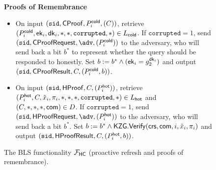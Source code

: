 \begin{figure*}
{{    \textbf{Proofs of Remembrance}
    \begin{itemize}
        \item On input $(\texttt{sid},\mathsf{CProof}, P_i^{\mathsf{cold}}, (C))$, retrieve $(P_i^{\mathsf{cold}}, \mathsf{ek}_i, \mathsf{dk}_i, *, *,\allowbreak \texttt{corrupted}, *) \in L_{\mathsf{cold}}$.
        If $\texttt{corrupted} = 1$, send $(\sid, \mathsf{CProofRequest},\allowbreak \adv, (P_i^\cold))$ to the adversary, who will send back a bit $b^*$ to represent whether the query should be responded to honestly. Set $b := b^* \land (\mathsf{ek}_i = g_2^{\mathsf{dk}_i})$ and
        output $(\texttt{sid}, \mathsf{CProofResult}, C, (P_i^{\mathsf{cold}}, b))$.
    
        \item On input $(\texttt{sid},\mathsf{HProof}, C, (P_i^{\mathsf{hot}}))$, retrieve $(P_i^{\mathsf{hot}}, C, \tilde{x}_i, \pi_i, *, *, *,\allowbreak \texttt{corrupted}, *) \in L_{\mathsf{hot}}$ and $(C, *, *, *, \mathsf{com}) \in D$. %
        If $\texttt{corrupted} = 1$, send $(\sid, \mathsf{HProofRequest}, \adv, (P_i^\hot))$ to the adversary, who will send back a bit $b^*$. Set $b := b^* \land \mathsf{KZG}.\mathsf{Verify}(\mathsf{crs}, \mathsf{com}, i, \tilde{x}_i, \pi_i)$ and
        output $(\texttt{sid}, \mathsf{HProofResult}, C, (P_i^{\mathsf{hot}}, b))$.
    \end{itemize}
    }}
    \caption{The BLS \hcwl functionality $\mathcal{F}_\mathsf{HC}$ (proactive refresh and proofs of remembrance).}
        \label{fig:FSign2}
    \end{figure*}
